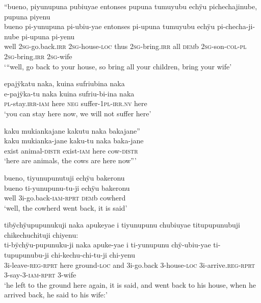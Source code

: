 \ea%
\begingl 
\glpreamble “bueno, piyunupuna pubiuyae entonses pupuna tumuyubu echÿu pichechajinube, pupuna piyenu\\
\gla bueno pi-yunupuna pi-ubiu-yae entonses pi-upuna tumuyubu echÿu pi-checha-ji-nube pi-upuna pi-yenu\\ 
\glb well 2\textsc{sg}-go.back.\textsc{irr} 2\textsc{sg}-house-\textsc{loc} thus 2\textsc{sg}-bring.\textsc{irr} all \textsc{dem}b 2\textsc{sg}-son-\textsc{col}-\textsc{pl} 2\textsc{sg}-bring.\textsc{irr} 2\textsc{sg}-wife\\ 
\glft ‘“well, go back to your house, so bring all your children, bring your wife’
\endgl
\xe

\ea%
\begingl 
\glpreamble epajÿkatu naka, kuina sufriubina naka\\
\gla e-pajÿka-tu naka kuina sufriu-bi-ina naka\\ 
\textsc{pl}-stay.\textsc{irr}-\textsc{iam} here \textsc{neg} suffer-1\textsc{pl}-\textsc{irr.nv} here\\ 
\glft ‘you can stay here now, we will not suffer here’\\ 
\endgl
\xe


\ea%
\begingl 
\glpreamble kaku mukiankajane kakutu naka bakajane”\\
\gla kaku mukianka-jane kaku-tu naka baka-jane\\ 
\glb exist animal-\textsc{distr} exist-\textsc{iam} here cow-\textsc{distr}\\ 
\glft ‘here are animals, the cows are here now”’\\ 
\endgl
\xe

\ea%
\begingl 
\glpreamble bueno, tiyunupunutuji echÿu bakeronu\\
\gla bueno ti-yunupunu-tu-ji echÿu bakeronu\\ 
\glb well 3i-go.back-\textsc{iam}-\textsc{rprt} \textsc{dem}b cowherd\\ 
\glft ‘well, the cowherd went back, it is said’\\ 
\endgl
\xe

\ea%
\begingl 
\glpreamble tibÿchÿupupunukuji naka apukeyae i tiyunupunu chubiuyae titupupunubuji \\chikechuchituji chiyenu:\\
\gla ti-bÿchÿu-pupunuku-ji naka apuke-yae i ti-yunupunu chÿ-ubiu-yae ti-tupupunubu-ji chi-kechu-chi-tu-ji chi-yenu\\ 
\glb 3i-leave-\textsc{reg}-\textsc{rprt} here ground-\textsc{loc} and 3i-go.back 3-house-\textsc{loc} 3i-arrive.\textsc{reg}-\textsc{rprt} 3-say-3-\textsc{iam}-\textsc{rprt} 3-wife\\ 
\glft ‘he left to the ground here again, it is said, and went back to his house, when he arrived back, he said to his wife:’\\ 
\endgl
\xe


